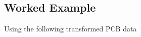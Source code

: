 \documentclass[11pt,a4paper]{article}
\begin{document}
\hypertarget{worked-example}{%
\subsection{Worked Example}\label{worked-example}}

Using the following transformed PCB data

\end{document}
